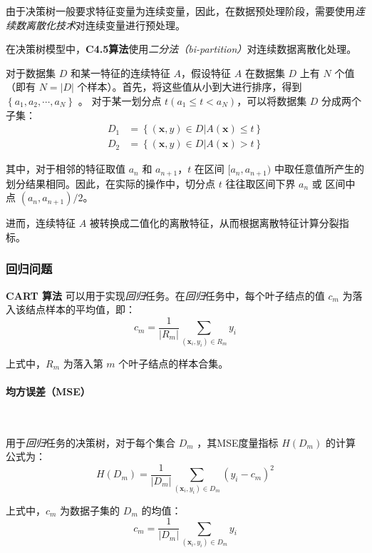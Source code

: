 \documentclass{ctexart}
\numberwithin{equation}{section}
\begin{document}
由于决策树一般要求特征变量为连续变量，因此，在数据预处理阶段，需要使用\emph{连续数离散化技术}对连续变量进行预处理。

在决策树模型中，\textbf{C4.5算法}使用\emph{二分法（bi-partition）}对连续数据离散化处理。

对于数据集 $D$ 和某一特征的连续特征 $A$，假设特征 $A$ 在数据集 $D$ 上有 $N$ 个值（即有 $N = |D|$ 个样本）。首先，将这些值从小到大进行排序，得到 $\left\{ a_1, a_2, \cdots, a_N \right\}$ 。 对于某一划分点 $ t(a_1 \leq t < a_N)$，可以将数据集 $D$ 分成两个子集：
\begin{subequations}
	\begin{align}
		D_1 &= \left\{(\boldsymbol{x},y) \in D | A(\boldsymbol{x}) \leq t \right\} \\
		D_2 &= \left\{(\boldsymbol{x},y) \in D | A(\boldsymbol{x}) > t \right\}
	\end{align}
\end{subequations}

其中，对于相邻的特征取值 $a_n$ 和 $a_{n+1}$，$t$ 在区间 $[a_n, a_{n+1})$ 中取任意值所产生的划分结果相同。因此，在实际的操作中，切分点 $t$ 往往取区间下界 $a_n$ 或 区间中点 $(a_n, a_{n+1}) / 2$。

进而，连续特征 $A$ 被转换成二值化的离散特征，从而根据离散特征计算分裂指标。

\subsubsection{回归问题}

\textbf{CART 算法} 可以用于实现\emph{回归}任务。在\emph{回归}任务中，每个叶子结点的值 $c_m$ 为落入该结点样本的平均值，即：
\begin{equation}
	c_m = \frac{1}{|R_m|} \sum_{(\boldsymbol{x}_i, y_i) \in R_m} y_i
\end{equation}

上式中，$R_m$ 为落入第 $m$ 个叶子结点的样本合集。


\paragraph{均方误差（MSE）}~{}

用于\emph{回归}任务的决策树，对于每个集合 $D_m$ ，其MSE度量指标 $H(D_m)$ 的计算公式为：
\begin{equation}
	H(D_m) = \frac{1}{|D_m|} \sum_{(\boldsymbol{x}_i, y_i) \in D_m} (y_i - c_m)^2
\end{equation}

上式中，$c_m$ 为数据子集的 $D_m$ 的均值： 
\begin{equation}
	c_m = \frac{1}{|D_m|} \sum_{(\boldsymbol{x}_i, y_i) \in D_m} y_i
\end{equation}
\end{document}
